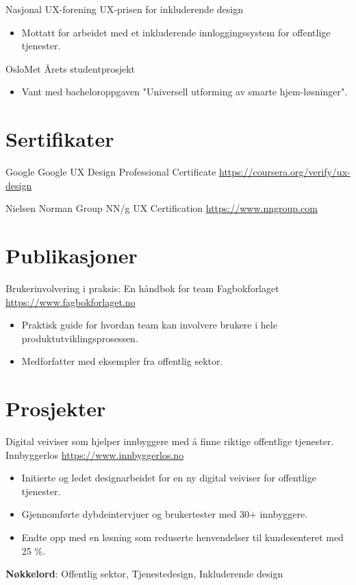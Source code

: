 \documentclass[a4paper, serif, 10pt]{moderncv}
\begin{document}
        {Nasjonal UX-forening}
        {UX-prisen for inkluderende design}
        {}
        {}
        {\begin{itemize}
\item Mottatt for arbeidet med et inkluderende innloggingssystem for offentlige tjenester.
\end{itemize}}

        {OsloMet}
        {Årets studentprosjekt}
        {}
        {}
        {\begin{itemize}
\item Vant med bacheloroppgaven "Universell utforming av smarte hjem-løsninger".
\end{itemize}}
\section{Sertifikater}

        {Google}
        {Google UX Design Professional Certificate}
        {\url{https://coursera.org/verify/ux-design}}
        {}
        {}

        {Nielsen Norman Group}
        {NN/g UX Certification}
        {\url{https://www.nngroup.com}}
        {}
        {}
\section{Publikasjoner}

        {Brukerinvolvering i praksis: En håndbok for team}
        {Fagbokforlaget}
        {\url{https://www.fagbokforlaget.no}}
        {}
        {\begin{itemize}
\item Praktisk guide for hvordan team kan involvere brukere i hele produktutviklingsprosessen.
\item Medforfatter med eksempler fra offentlig sektor.
\end{itemize}}
\section{Prosjekter}

        {Digital veiviser som hjelper innbyggere med å finne riktige offentlige tjenester.}
        {Innbyggerlos}
        {\url{https://www.innbyggerlos.no}}
        {}
        {\begin{itemize}
\item Initierte og ledet designarbeidet for en ny digital veiviser for offentlige tjenester.
\item Gjennomførte dybdeintervjuer og brukertester med 30+ innbyggere.
\item Endte opp med en løsning som reduserte henvendelser til kundesenteret med 25 \%.
\end{itemize}
\textbf{Nøkkelord}: Offentlig sektor, Tjenestedesign, Inkluderende design}
\end{document}
